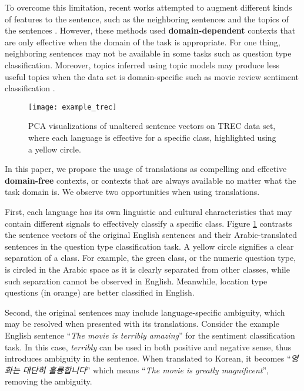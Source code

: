 \documentclass{article}
\begin{document}
To overcome this limitation, recent works attempted to augment different kinds of features to the sentence, such as the neighboring sentences \cite{lin2015hierarchical} 
and the topics of the sentences \cite{zhao2017topic}.
However, these methods used {\bf domain-dependent} contexts that are only effective when the domain of the task is appropriate.
For one thing,
neighboring sentences 
may not be available in some tasks such as question type classification. Moreover, topics 
inferred using topic models 
may produce less useful topics when the data set is domain-specific such as movie review sentiment classification \cite{mimno2011optimizing}.


\begin{figure}[t]
	\centering
	\texttt{[image: example\_trec]}
	\caption{PCA visualizations of unaltered sentence vectors on TREC data set, where each language is effective for a specific class,  highlighted using a yellow circle.}
	\label{fig:trecvecs}
\end{figure}


In this paper, 
we propose the usage of translations as compelling and effective \textbf{domain-free} contexts, or contexts that are always available no matter what the task domain is. We observe two opportunities when using translations.
\begin{CJK}{UTF8}{}


First, each language has its own linguistic and cultural characteristics that may contain different signals to effectively classify a specific class.
Figure \ref{fig:trecvecs} contrasts the sentence vectors of
the original English sentences and their Arabic-translated sentences in the question type classification task.
A yellow circle signifies a clear separation of a class.
For example, 
the green class, or the numeric question type, is circled in the Arabic space as it is clearly separated from other classes, while such separation
cannot be observed
in English. Meanwhile, location type questions (in orange)
are better classified in English.


Second, the original 
sentences may include language-specific ambiguity, which may be resolved when presented with its translations.
Consider the example English sentence ``\textit{The movie is terribly amazing}'' for the sentiment classification task. In this case, 
\textit{terribly}
can be used in both 
positive and negative sense, 
thus introduces ambiguity in the sentence. When translated to Korean,
it becomes ``\textit{영화는 대단히 훌륭합니다}'' which means ``\textit{The movie is greatly magnificent}'', removing the ambiguity.
\end{CJK}
\end{document}
